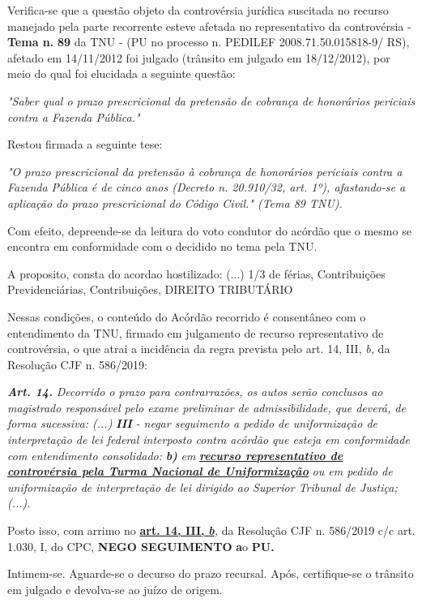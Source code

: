 \documentclass[12pt]{article}
\begin{document}
\justifying
\noindent Verifica-se que a questão objeto da controvérsia jurídica suscitada no recurso manejado pela parte recorrente esteve afetada no representativo da controvérsia - \textbf{Tema n. }\textbf{89} da TNU - (PU no processo n. PEDILEF 2008.71.50.015818-9/ RS),  afetado em 14/11/2012 foi julgado (trânsito em julgado em 18/12/2012), por meio do qual foi elucidada a seguinte questão:

\noindent \textit{"Saber qual o prazo prescricional da pretensão de cobrança de honorários periciais contra a Fazenda Pública."}

\noindent Restou firmada a seguinte tese:

\noindent \textit{"O prazo prescricional da pretensão à cobrança de honorários periciais contra a Fazenda Pública é de cinco anos (Decreto n. 20.910/32, art. 1º), afastando-se a aplicação do prazo prescricional do Código Civil." (Tema 89 TNU).}

\noindent Com efeito, depreende-se da leitura do voto condutor do acórdão que o mesmo se encontra em conformidade com o decidido no  tema pela TNU.

\noindent A proposito, consta do acordao hostilizado: (...) 1/3 de férias, Contribuições Previdenciárias, Contribuições, DIREITO TRIBUTÁRIO

\noindent Nessas condições, o conteúdo do Acórdão recorrido é consentâneo com o entendimento da TNU, firmado em julgamento de recurso representativo de controvérsia, o que atrai a incidência da regra prevista pelo art. 14, III, \textit{b,} da Resolução CJF n. 586/2019:

\noindent \textit{\textbf{Art. 14.}}\textit{ Decorrido o prazo para contrarrazões, os autos serão conclusos ao magistrado responsável pelo exame preliminar de admissibilidade, que deverá, de forma sucessiva: (...) }\textit{\textbf{III }}\textit{- negar seguimento a pedido de uniformização de interpretação de lei federal interposto contra acórdão que esteja em conformidade com entendimento consolidado: }\textit{\textbf{b)}}\textit{ em }\uline{\textit{\textbf{recurso representativo de controvérsia pela Turma Nacional de Uniformização}}}\textit{ ou em pedido de uniformização de interpretação de lei dirigido ao Superior Tribunal de Justiça;(...).}

\noindent Posto isso, com arrimo no \uline{\textbf{art. 14, III, }}\uline{\textit{\textbf{b}}}\textit{,} da Resolução CJF n. 586/2019 c/c art. 1.030, I, do CPC, \textbf{NEGO SEGUIMENTO }\textbf{a}o\textbf{ PU}\textbf{.}

\noindent Intimem-se. Aguarde-se o decurso do prazo recursal. Após, certifique-se o trânsito em julgado e devolva-se ao juízo de origem.
\end{document}

